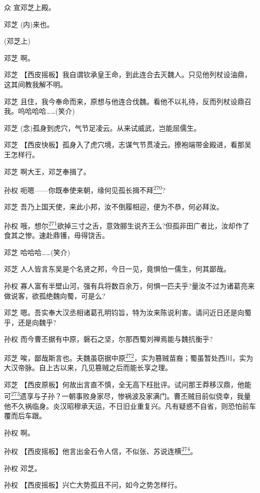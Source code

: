 众 宣邓芝上殿。

邓芝 (内)来也。

(邓芝上)

邓芝 啊。

邓芝
【西皮摇板】我自谓钦承皇王命，到此连合去灭魏人。只见他列杖设油鼎，这其间教我解不明。

邓芝
且住，我今奉命而来，原想与他连合伐魏。看他不以礼待，反而列杖设鼎召我。呜哈哈哈\ldots{}\ldots{}(笑介)

邓芝 (念)孤身到虎穴，气节足凌云。从来试威武，岂能屈儒生。

邓芝
【西皮快板】孤身入了虎穴境，志谋气节贯凌云。撩袍端带金殿进，看那吴王怎样行。

邓芝 啊大王，邓芝奉揖了。

孙权
呃嗯------你既奉使来朝，缘何见孤长揖不拜\protect\hyperlink{fn270}{\textsuperscript{270}}?

邓芝 吾乃上国天使，来此小邦，汝不倒履相迎，便为不恭，何必拜汝。

孙权
哦，想尔\protect\hyperlink{fn271}{\textsuperscript{271}}欲掉三寸之舌，意效郦生说齐王么?但孤非田广者比，汝却作了食其之惨。速赴鼎镬，毋得饶舌。

邓芝 哈哈哈\ldots{}\ldots{}(笑介)

邓芝 人人皆言东吴是个名贤之邦，今日一见，竟惧怕一儒生，何其鄙哉。

孙权
寡人富有半壁山河，强有兵将数百余万，何惧一匹夫乎?量汝不过为诸葛亮来做说客，欲孤绝魏向蜀，可是么?

邓芝
嗯。吾实奉大汉丞相诸葛孔明钧旨，特为汝来陈说利害。请问近日还是向蜀乎，还是向魏乎?

孙权 而今曹丕据有中原，磐石之坚，尔那西蜀刘禅焉能与魏抗衡乎?

邓芝
唉，鄙哉斯言也。夫魏虽窃据中原\protect\hyperlink{fn272}{\textsuperscript{272}}，实为篡贼苗裔；蜀虽暂处西川，实为大汉帝脉。自上古以来，几见篡贼之后而能长享之理。

邓芝
【西皮原板】何故出言直不慎，全无高下枉批评。试问那王莽移汉鼎，他能可\protect\hyperlink{fn273}{\textsuperscript{273}}遗享与子孙？一朝事败身家尽，惨祸波及家满门。曹丕贼目前似侥幸，我量他不久祸临身。炎汉昭穆承天运，不日旧业重复兴。凡有疑惑不自省，则恐怕前车覆而后车跟。

孙权 啊。

孙权
【西皮摇板】他言出金石令人信，不似张、苏说连横\protect\hyperlink{fn274}{\textsuperscript{274}}。

孙权 邓芝。

孙权 【西皮摇板】兴亡大势孤且不问，如今之势怎样行。

